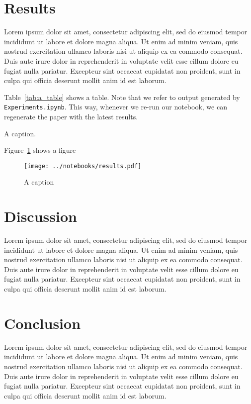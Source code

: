 \documentclass[11pt,a4paper]{article}
\begin{document}
\section{Results}

Lorem ipsum dolor sit amet, consectetur adipiscing elit, sed do eiusmod tempor incididunt ut labore et dolore magna aliqua. Ut enim ad minim veniam, quis nostrud exercitation ullamco laboris nisi ut aliquip ex ea commodo consequat. Duis aute irure dolor in reprehenderit in voluptate velit esse cillum dolore eu fugiat nulla pariatur. Excepteur sint occaecat cupidatat non proident, sunt in culpa qui officia deserunt mollit anim id est laborum.


Table~\ref{tab:a_table} shows a table. Note that we refer to output generated by \texttt{Experiments.ipynb}. This way, whenever we re-run our notebook, we can regenerate the paper with the latest results.

\begin{table}[ht]
\centering

\caption{\label{tab:a_table} A caption. }
\end{table}

Figure~\ref{fig:a_label} shows a figure

\begin{figure}[ht]
	\centering
	\texttt{[image: ../notebooks/results.pdf]}
	\caption{A caption}
	\label{fig:a_label}
\end{figure}

\section{Discussion}

Lorem ipsum dolor sit amet, consectetur adipiscing elit, sed do eiusmod tempor incididunt ut labore et dolore magna aliqua. Ut enim ad minim veniam, quis nostrud exercitation ullamco laboris nisi ut aliquip ex ea commodo consequat. Duis aute irure dolor in reprehenderit in voluptate velit esse cillum dolore eu fugiat nulla pariatur. Excepteur sint occaecat cupidatat non proident, sunt in culpa qui officia deserunt mollit anim id est laborum.


\section{Conclusion}
Lorem ipsum dolor sit amet, consectetur adipiscing elit, sed do eiusmod tempor incididunt ut labore et dolore magna aliqua. Ut enim ad minim veniam, quis nostrud exercitation ullamco laboris nisi ut aliquip ex ea commodo consequat. Duis aute irure dolor in reprehenderit in voluptate velit esse cillum dolore eu fugiat nulla pariatur. Excepteur sint occaecat cupidatat non proident, sunt in culpa qui officia deserunt mollit anim id est laborum.
\end{document}
